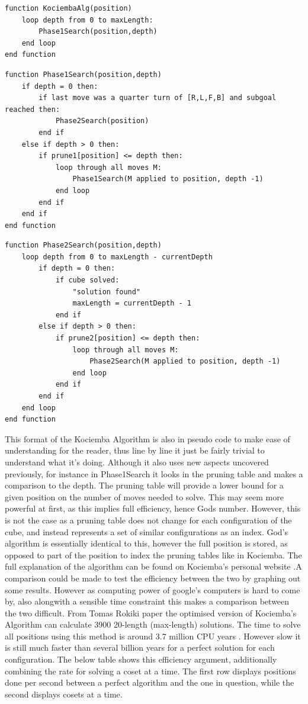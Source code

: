 \documentclass{article}
\begin{document}
\begin{lstlisting}
function KociembaAlg(position)
	loop depth from 0 to maxLength:
		Phase1Search(position,depth)
	end loop
end function
\end{lstlisting}
\begin{lstlisting}
function Phase1Search(position,depth)
	if depth = 0 then:
		if last move was a quarter turn of [R,L,F,B] and subgoal reached then:
			Phase2Search(position)
		end if
	else if depth > 0 then:
		if prune1[position] <= depth then:
			loop through all moves M:
				Phase1Search(M applied to position, depth -1)
			end loop
		end if
	end if
end function
\end{lstlisting}
\begin{lstlisting}
function Phase2Search(position,depth)
	loop depth from 0 to maxLength - currentDepth
		if depth = 0 then:
			if cube solved:
				"solution found"
				maxLength = currentDepth - 1
			end if
		else if depth > 0 then:
			if prune2[position] <= depth then:
				loop through all moves M:
					Phase2Search(M applied to position, depth -1)
				end loop
			end if
		end if
	end loop
end function
\end{lstlisting}
This format of the Kociemba Algorithm is also in pseudo code to make ease of understanding for the reader, thus line by line it just be fairly trivial to understand what it's doing. Although it also uses new aspects uncovered previously, for instance in Phase1Search it looks in the pruning table and makes a comparison to the depth. The pruning table will provide a lower bound for a given position on the number of moves needed to solve. This may seem more powerful at first, as this implies full efficiency, hence Gods number. However, this is not the case as a pruning table does not change for each configuration of the cube, and instead represents a set of similar configurations as an index. God's algorithm is essentially identical to this, however the full position is stored, as opposed to part of the position to index the pruning tables like in Kociemba. The full explanation of the algorithm can be found on Kociemba's personal website \cite{kocweb}.\newline A comparison could be made to test the efficiency between the two by graphing out some results. However as computing power of google's computers is hard to come by, also alongwith a sensible time constraint this makes a comparison between the two difficult. From Tomas Rokiki paper the optimised version of Kociemba's Algorithm can calculate 3900 20-length (max-length) solutions. The time to solve all positions using this method is around 3.7 million CPU years \cite{Rokicki2013TheDO}. However slow it is still much faster than several billion years for a perfect solution for each configuration. The below table shows this efficiency argument, additionally combining the rate for solving a coset at a time. The first row displays positions done per second between a perfect algorithm and the one in question, while the second displays cosets at a time.
\end{document}
